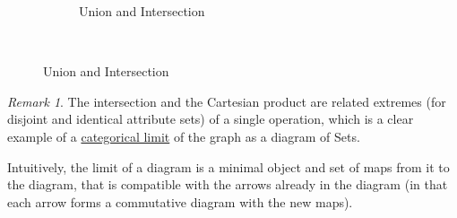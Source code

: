 \documentclass{article}
\theoremstyle{definition}
\theoremstyle{remark}
\newtheorem*{remark}{Remark}
\newcommand{\var}[1]{\mathsf{#1}}
\begin{document}
\begin{figure}
\begin{subfigure}{0.51\textwidth}
	\caption{Union and Intersection}\label{fig:union+intersect}
\end{subfigure}\\
	\label{fig:cart+union+intersect}
\end{figure}
\begin{remark}
	The intersection and the Cartesian product are related extremes (for disjoint and identical attribute sets) of a single operation, which is a clear example of a \href{https://en.wikipedia.org/wiki/Limit_(category_theory)}{categorical limit} of the graph as a diagram of Sets.
	
	Intuitively, the limit of a diagram is a minimal object and set of maps from it to the diagram, that is compatible with the arrows already in the diagram (in that each arrow forms a commutative diagram with the new maps). 
\end{remark}
\end{document}
